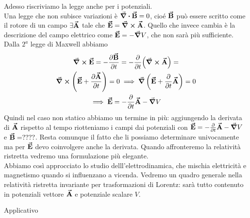 


Adesso riscriviamo la legge anche per i potenziali.\\
Una legge che non subisce variazioni è $\div\vb*{\va{B}}=0$, cioé $\vb*{\va{B}}$ può essere scritto come il rotore di un campo $\exists\vb*{\va{A}}$ tale che $\vb*{\va{E}}=\curl\vb*{\va{A}}$. Quello che invece cambia è la descrizione del campo elettrico come $\vb*{\va{E}}= -\grad V$, che non sarà più sufficiente. Dalla $2^a$ legge di Maxwell abbiamo
\begin{gather*}
	\curl\vb*{\va{E}}= -\pdv{\vb*{\va{B}}}{t}=-\pdv{t} (\curl\vb*{\va{A}})=\\
	\curl\left(\vb*{\va{E}}+\pdv{\vb*{\va{A}}}{t} \right)=0 \implies \grad\left( \vb*{\va{E}}+\pdv{t}\vb*{\va{A}} \right)=0\\
	\implies \vb*{\va{E}}=-\pdv{t} \vb*{\va{A}} -\grad V
\end{gather*}
Quindi nel caso non statico abbiamo un termine in più: aggiungendo la derivata di $\vb*{\va{A}}$ rispetto al tempo riotteniamo i campi dai potenziali con $\vb*{\va{E}}=-\pdv{t} \vb*{\va{A}} -\grad V$ e $\vb*{\va{B}}=????$. Resta comunque il fatto che li possiamo determinare univocamente ma per $\vb*{\va{E}}$ devo coinvolgere anche la derivata. Quando affronteremo la relatività ristretta vedremo una formulazione più elegante.\\

Abbiamo così approcciato lo studio delll'elettrodinamica, che mischia elettricità e magnetismo quando si influenzano a vicenda. Vedremo un quadro generale nella relatività ristretta invariante per trasformazioni di Lorentz: sarà tutto contenuto in potenziali vettore $\vb*{\va{A}}$ e potenziale scalare $V$.



Applicativo
